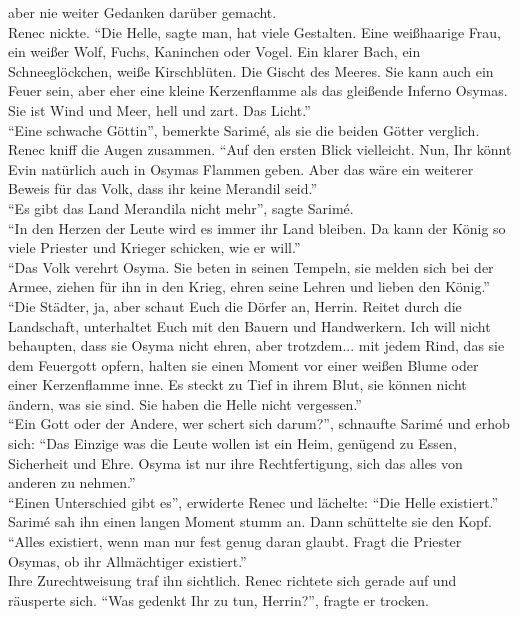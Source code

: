 aber 
nie weiter Gedanken darüber gemacht.\\
Renec nickte. ``Die Helle, sagte man, hat viele Gestalten. Eine weißhaarige Frau, ein weißer Wolf, 
Fuchs, Kaninchen oder Vogel. Ein klarer Bach, ein Schneeglöckchen, weiße Kirschblüten. Die Gischt 
des Meeres. Sie kann auch ein Feuer sein, aber eher eine kleine Kerzenflamme als das gleißende 
Inferno Osymas. Sie ist Wind und Meer, hell und zart. Das Licht.''\\
``Eine schwache Göttin'', bemerkte Sarimé, als sie die beiden Götter verglich. \\
Renec kniff die Augen zusammen. ``Auf den ersten Blick vielleicht. Nun, Ihr könnt Evin natürlich 
auch 
in Osymas Flammen geben. Aber das wäre ein weiterer Beweis für das Volk, dass ihr keine Merandil 
seid.''\\
``Es gibt das Land Merandila nicht mehr'', sagte Sarimé.\\
``In den Herzen der Leute wird es immer ihr Land bleiben. Da kann der König so viele Priester und 
Krieger schicken, wie er will.''\\
``Das Volk verehrt Osyma. Sie beten in seinen Tempeln, sie melden sich bei der Armee, ziehen für 
ihn 
in den Krieg, ehren seine Lehren und lieben den König.''\\
``Die Städter, ja, aber schaut Euch die Dörfer an, Herrin. Reitet durch die Landschaft, unterhaltet 
Euch mit den Bauern und Handwerkern. Ich will nicht behaupten, dass sie Osyma nicht ehren, aber 
trotzdem... mit jedem Rind, das sie dem Feuergott opfern, halten sie einen Moment vor einer weißen 
Blume oder einer Kerzenflamme inne. Es steckt zu Tief in ihrem Blut, sie können nicht ändern, was 
sie sind. Sie haben die Helle nicht vergessen.''\\
``Ein Gott oder der Andere, wer schert sich darum?'', schnaufte Sarimé und erhob sich: ``Das 
Einzige 
was die Leute wollen ist ein Heim, genügend zu Essen, Sicherheit und Ehre. Osyma ist nur ihre 
Rechtfertigung, sich das alles von anderen zu nehmen.''\\
``Einen Unterschied gibt es'', erwiderte Renec und lächelte: ``Die Helle existiert.''\\
Sarimé sah ihn einen langen Moment stumm an. Dann schüttelte sie den Kopf. ``Alles existiert, wenn 
man nur fest genug daran glaubt. Fragt die Priester Osymas, ob ihr Allmächtiger existiert.''\\
Ihre Zurechtweisung traf ihn sichtlich. Renec richtete sich gerade auf und räusperte sich. ``Was 
gedenkt Ihr zu tun, Herrin?'', fragte er trocken.\\
